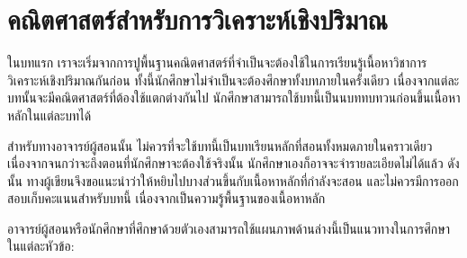 \chapter{คณิตศาสตร์สำหรับการวิเคราะห์เชิงปริมาณ}

ในบทแรก เราจะเริ่มจากการปูพื้นฐานคณิตศาสตร์ที่จำเป็นจะต้องใช้ในการเรียนรู้เนื้อหาวิชาการวิเคราะห์เชิงปริมาณกันก่อน
ทั้งนี้นักศึกษาไม่จำเป็นจะต้องศึกษาทั้งบทภายในครั้งเดียว เนื่องจากแต่ละบทนั้นจะมีคณิตศาสตร์ที่ต้องใช้แตกต่างกันไป นักศึกษาสามารถใช้บทนี้เป็นนบททบทวนก่อนขึ้นเนื้อหาหลักในแต่ละบทได้

สำหรับทางอาจารย์ผู้สอนนั้น ไม่ควรที่จะใช้บทนี้เป็นบทเรียนหลักที่สอนทั้งหมดภายในคราวเดียว เนื่องจากจนกว่าจะถึงตอนที่นักศึกษาจะต้องใช้จริงนั้น นักศึกษาเองก็อาจจะจำรายละเอียดไม่ได้แล้ว
ดังนั้น ทางผู้เขียนจึงขอแนะนำว่าให้หยิบไปบางส่วนขึ้นกับเนื้อหาหลักที่กำลังจะสอน และไม่ควรมีการออกสอบเก็บคะแนนสำหรับบทนี้ เนื่องจากเป็นความรู้พื้นฐานของเนื้อหาหลัก

อาจารย์ผู้สอนหรือนักศึกษาที่ศึกษาด้วยตัวเองสามารถใช้แผนภาพด้านล่างนี้เป็นแนวทางในการศึกษาในแต่ละหัวข้อ:

